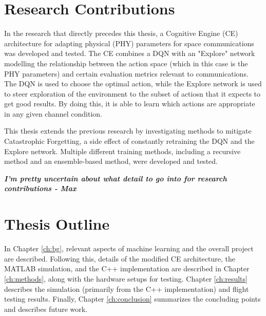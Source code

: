 \section{Research Contributions}
\par In the research that directly precedes this thesis\cite{paulo_thesis}\cite{tim_paper}, a Cognitive Engine (CE) architecture for adapting physical (PHY) parameters for space communications was developed and tested. The CE combines a DQN with an "Explore" network modelling the relationship between the action space (which in this case is the PHY parameters) and certain evaluation metrics relevant to communications. The DQN is used to choose the optimal action, while the Explore network is used to steer exploration of the environment to the subset of actiosn that it expects to get good results. By doing this, it is able to learn which actions are appropriate in any given channel condition.  
\par This thesis extends the previous research by investigating methods to mitigate Catastrophic Forgetting, a side effect of constantly retraining the DQN and the Explore network. Multiple different training methods, including a recursive method and an ensemble-based method, were developed and tested. 
\par \textit{\textbf{ I'm pretty uncertain about what detail to go into for research contributions - Max}}
\section{Thesis Outline}
\par In Chapter \ref{ch:bg}, relevant aspects of machine learning and the overall project are described. Following this, details of the modified CE architecture, the MATLAB simulation, and the C++ implementation are described in Chapter \ref{ch:methods}, along with the hardware setups for testing. Chapter \ref{ch:results} describes the simulation (primarily from the C++ implementation) and flight testing results. Finally, Chapter \ref{ch:conclusion} summarizes the concluding points and describes future work.

